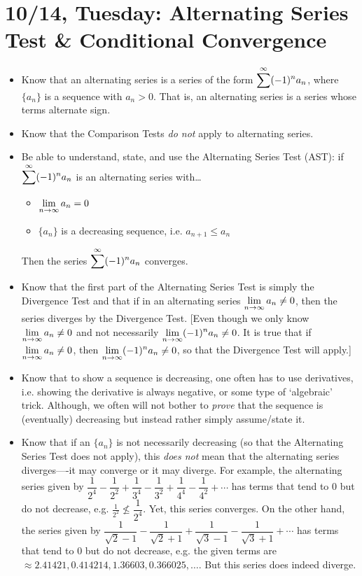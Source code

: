 \documentclass[11pt,letterpaper]{article}
\begin{document}
\section*{10/14, Tuesday: Alternating Series Test \& Conditional Convergence\label{10-14}}

\begin{itemize}
\item Know that an alternating series is a series of the form $\displaystyle\sum^\infty (-1)^n a_n$, where $\{ a_n \}$ is a sequence with $a_n > 0$. That is, an alternating series is a series whose terms alternate sign. 

\item Know that the Comparison Tests \textit{do not} apply to alternating series.

\item Be able to understand, state, and use the Alternating Series Test (AST): if $\displaystyle\sum^\infty (-1)^n a_n$ is an alternating series with\dots
	\begin{itemize}
	\item $\displaystyle\lim_{n \to \infty} a_n= 0$
	\item $\{ a_n \}$ is a decreasing sequence, i.e. $a_{n+1} \leq a_n$
	\end{itemize}
Then the series $\displaystyle\sum^\infty (-1)^n a_n$ converges.

\item Know that the first part of the Alternating Series Test is simply the Divergence Test and that if in an alternating series $\displaystyle\lim_{n \to \infty} a_n \neq 0$, then the series diverges by the Divergence Test. [Even though we only know $\displaystyle\lim_{n \to \infty} a_n \neq 0$ and not necessarily $\displaystyle\displaystyle\lim_{n \to \infty} (-1)^n a_n \neq 0$. It is true that if $\displaystyle\lim_{n \to \infty} a_n \neq 0$, then $\displaystyle\lim_{n \to \infty} (-1)^n a_n \neq 0$, so that the Divergence Test will apply.]

\item Know that to show a sequence is decreasing, one often has to use derivatives, i.e. showing the derivative is always negative, or some type of `algebraic' trick. Although, we often will not bother to \textit{prove} that the sequence is (eventually) decreasing but instead rather simply assume/state it.

\item Know that if an $\{ a_n \}$ is not necessarily decreasing (so that the Alternating Series Test does not apply), this \textit{does not} mean that the alternating series diverges----it may converge or it may diverge. For example, the alternating series given by $\dfrac{1}{2^4} - \dfrac{1}{2^2} + \dfrac{1}{3^4} - \dfrac{1}{3^2} + \dfrac{1}{4^4} - \dfrac{1}{4^2} + \cdots$ has terms that tend to 0 but do not decrease, e.g. $\frac{1}{2^2} \not\leq \dfrac{1}{2^4}$. Yet, this series converges. On the other hand, the series given by $\dfrac{1}{\sqrt{2} - 1} - \dfrac{1}{\sqrt{2} + 1} + \dfrac{1}{\sqrt{3} - 1} - \dfrac{1}{\sqrt{3} + 1} + \cdots$ has terms that tend to 0 but do not decrease, e.g. the given terms are $\approx 2.41421, 0.414214, 1.36603, 0.366025, \ldots$. But this series does indeed diverge. 


\end{itemize}
\end{document}
